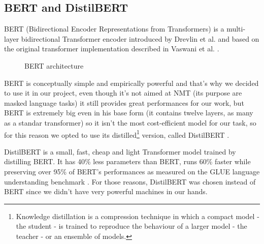\subsection{BERT and DistilBERT}\label{subsec:bert}
BERT (Bidirectional Encoder Representations from Transformers) is a multi-layer bidirectional Transformer encoder introduced by Drevlin et al. \cite{devlin2018bert} and  based on the original transformer implementation described in Vaswani et al. \cite{vaswani2017attention}.
\begin{figure}[H]%
    \centering
    \caption{BERT architecture}
    \label{fig:bert}%
\end{figure}
BERT is conceptually simple and empirically powerful and that's why we decided to use it in our project, even though it's not aimed at NMT (its purpose are masked language tasks) it still provides great performances for our work, but BERT is extremely big even in his base form (it contains twelve layers, as many as a standar transformer) so it isn't the most cost-efficient model for our task, so for this reason we opted to use its distilled\footnote{Knowledge distillation is a compression technique in which a compact model - the student - is trained to reproduce the behaviour of a larger model - the teacher - or an ensemble of models.} version, called DistilBERT \cite{sanh2019distilbert}.
\vspace{3mm}

DistilBERT is a small, fast, cheap and light Transformer model trained by distilling BERT. It has 40\% less parameters than BERT, runs 60\% faster while preserving over 95\% of BERT’s performances as measured on the GLUE language understanding benchmark \cite{wang2018glue}. For those reasons, DistilBERT was chosen instead of BERT since we didn't have very powerful machines in our hands.

